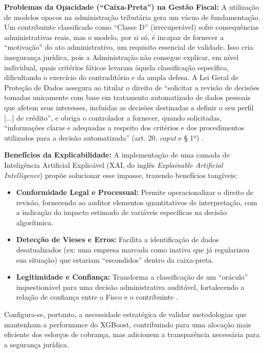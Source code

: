 \textbf{Problemas da Opacidade (``Caixa-Preta'') na Gestão Fiscal:}
A utilização de modelos opacos na administração tributária gera um vácuo de fundamentação. Um contribuinte classificado como ``Classe D'' (irrecuperável) sofre consequências administrativas reais, mas o modelo, por si só, é incapaz de fornecer a ``motivação'' do ato administrativo, um requisito essencial de validade. Isso cria insegurança jurídica, pois a Administração não consegue explicar, em nível individual, quais critérios fáticos levaram àquela classificação específica, dificultando o exercício do contraditório e da ampla defesa. A Lei Geral de Proteção de Dados assegura ao titular o direito de ``solicitar a revisão de decisões tomadas unicamente com base em tratamento automatizado de dados pessoais que afetem seus interesses, incluídas as decisões destinadas a definir o seu perfil [...] de crédito'', e obriga o controlador a fornecer, quando solicitadas, ``informações claras e adequadas a respeito dos critérios e dos procedimentos utilizados para a decisão automatizada'' (art. 20, \textit{caput} e § 1º) \cite{brasilLGPD2018}.

\textbf{Benefícios da Explicabilidade:}
A implementação de uma camada de Inteligência Artificial Explicável (XAI, do inglês \textit{Explainable Artificial Intelligence}) propõe solucionar esse impasse, trazendo benefícios tangíveis:
\begin{itemize}
    \item \textbf{Conformidade Legal e Processual:} Permite operacionalizar o direito de revisão, fornecendo ao auditor elementos quantitativos de interpretação, com a indicação do impacto estimado de variáveis específicas na decisão algorítmica.
    \item \textbf{Detecção de Vieses e Erros:} Facilita a identificação de dados desatualizados (ex: uma empresa marcada como inativa que já regularizou sua situação) que estariam ``escondidos'' dentro da caixa-preta.
    \item \textbf{Legitimidade e Confiança:} Transforma a classificação de um ``oráculo'' inquestionável para uma decisão administrativa auditável, fortalecendo a relação de confiança entre o Fisco e o contribuinte \cite{schwartzEnhancingMLModels2025}.
\end{itemize}

Configura-se, portanto, a necessidade estratégica de validar metodologias que mantenham a performance do XGBoost, contribuindo para uma alocação mais eficiente dos esforços de cobrança, mas adicionem a transparência necessária para a segurança jurídica.

